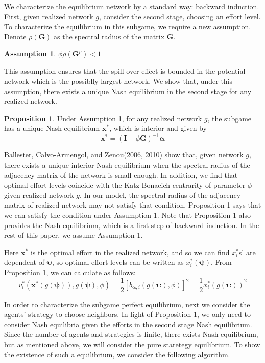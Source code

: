 \documentclass[12pt]{article}
\theoremstyle{definition}
\newtheorem{proposition}{Proposition}
\newtheorem{assumption}{Assumption}
\begin{document}
We characterize the equilibrium network by a standard way: backward induction.
First, given realized network $g$, consider the second stage, choosing an effort level.
To characterize the equilibrium in this subgame, we require a new assumption.
Denote $\rho (\bm{G})$ as the spectral radius of the matrix $\bm{G}$.

\begin{assumption}
$\phi \rho(\bm{G}^p) < 1$
\end{assumption}

This assumption ensures that the spill-over effect is bounded in the potential network which is the possiblly largest network.
We show that, under this assumption, there exists a unique Nash equilibrium in the second stage for any realized network.

\begin{proposition}
Under Assumption 1, for any realized network $g$, the subgame has a unique Nash equilibrium $\bm{x}^*$, which is interior and given by
\[ \bm{x}^* = {(\bm{I} - \phi \bm{G})}^{-1} \bm{\alpha} \]
\end{proposition}

Ballester, Calvo-Armengol, and Zenou(2006, 2010) show that, given network $g$, there exists a unique interior Nash equilibrium when the spectral radius of the adjacency matrix of the network is small enough.
In addition, we find that optimal effort levels coincide with the Katz-Bonacich centrarity of parameter $\phi$ given realized network $g$.
In our model, the spectral radius of the adjacency matrix of realized network may not satisfy that condition.
Proposition 1 says that we can satisfy the condition under Assumption 1.
Note that Proposition 1 also provides the Nash equilibrium, which is a first step of backward induction.
In the rest of this paper, we assume Assumption 1.

Here $\bm{x}^*$ is the optimal effort in the realized network, and so we can find $x_i^*$s' are dependent of $\bm{\psi}$, so optimal effort levels can be written as $x_i^*(\bm{\psi})$.
From Proposition 1, we can calculate as follows:
\begin{equation}
	\label{opteff}
	v_i^*(\bm{x}^*(g(\bm{\psi})), g(\bm{\psi}), \phi) = \frac{1}{2} {[b_{\bm{\alpha}, i}(g(\bm{\psi}), \phi)]}^2 = \frac{1}{2} {x_i^*(g(\bm{\psi}))}^2
\end{equation}

In order to characterize the subgame perfect equilibrium, next we consider the agents' strategy to choose neighbors.
In light of Proposition 1, we only need to consider Nash equilibria given the efforts in the second stage Nash equilibrium.
Since the number of agents and strategies is finite, there exists Nash equilibrium, but as mentioned above, we will consider the pure staretegy equilibrium.
To show the existence of such a equilibrium, we consider the following algorithm.
\end{document}
